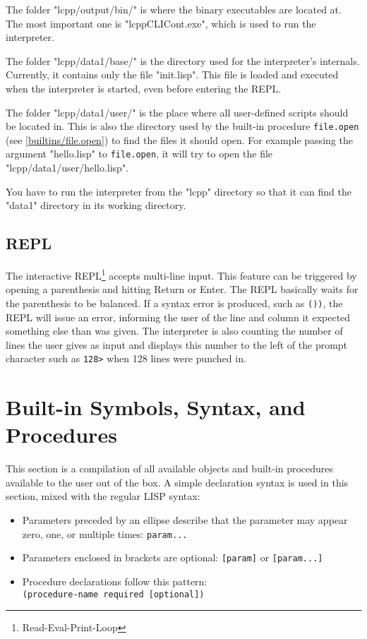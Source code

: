 \documentclass[a4paper]{scrartcl}
\begin{document}
	The folder "lcpp/output/bin/" is where the binary executables are located at. The most important one is "lcppCLICont.exe", which is used to run the interpreter.

	The folder "lcpp/data1/base/" is the directory used for the interpreter's internals. Currently, it contains only the file "init.lisp". This file is loaded and executed when the interpreter is started, even before entering the REPL.

	The folder "lcpp/data1/user/" is the place where all user-defined scripts should be located in. This is also the directory used by the built-in procedure \lstinline|file.open| (see \ref{builtins/file.open}) to find the files it should open. For example passing the argument "hello.lisp" to \lstinline|file.open|, it will try to open the file "lcpp/data1/user/hello.lisp".

	You have to run the interpreter from the "lcpp" directory so that it can find the "data1" directory in its working directory.

\subsection{REPL}
\label{usage/repl}
	The interactive REPL\footnote{Read-Eval-Print-Loop} accepts multi-line input. This feature can be triggered by opening a parenthesis and hitting Return or Enter. The REPL basically waits for the parenthesis to be balanced. If a syntax error is produced, such as \lstinline|())|, the REPL will issue an error, informing the user of the line and column it expected something else than was given. The interpreter is also counting the number of lines the user gives as input and displays this number to the left of the prompt character such as \lstinline|128>| when 128 lines were punched in.

\section{Built-in Symbols, Syntax, and Procedures}
\label{builtins}
	This section is a compilation of all available objects and built-in procedures available to the user out of the box. A simple declaration syntax is used in this section, mixed with the regular LISP syntax:

	\begin{itemize}
		\item Parameters preceded by an ellipse describe that the parameter may appear zero, one, or multiple times: \lstinline|param...|
		\item Parameters enclosed in brackets are optional: \lstinline|[param]| or \lstinline|[param...]|
		\item Procedure declarations follow this pattern:\\
			  \lstinline|(procedure-name required [optional])|
	\end{itemize}
\end{document}
